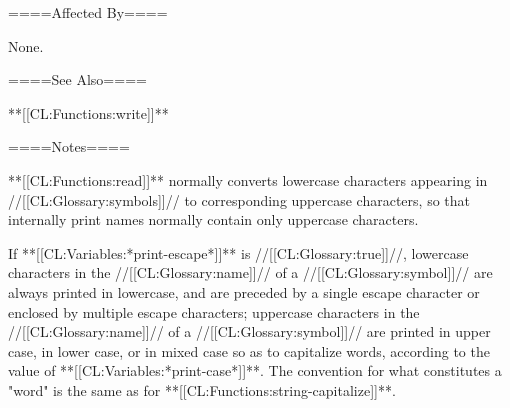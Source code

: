 ====Affected By====

None.

====See Also====

**[[CL:Functions:write]]**

====Notes====

**[[CL:Functions:read]]** normally converts lowercase characters appearing in //[[CL:Glossary:symbols]]// to corresponding uppercase characters, so that internally print names normally contain only uppercase characters.

If **[[CL:Variables:*print-escape*]]** is //[[CL:Glossary:true]]//, lowercase characters in the //[[CL:Glossary:name]]// of a //[[CL:Glossary:symbol]]// are always printed in lowercase, and are preceded by a single escape character or enclosed by multiple escape characters; uppercase characters in the //[[CL:Glossary:name]]// of a //[[CL:Glossary:symbol]]// are printed in upper case, in lower case, or in mixed case so as to capitalize words, according to the value of **[[CL:Variables:*print-case*]]**. The convention for what constitutes a "word" is the same as for **[[CL:Functions:string-capitalize]]**.

  
